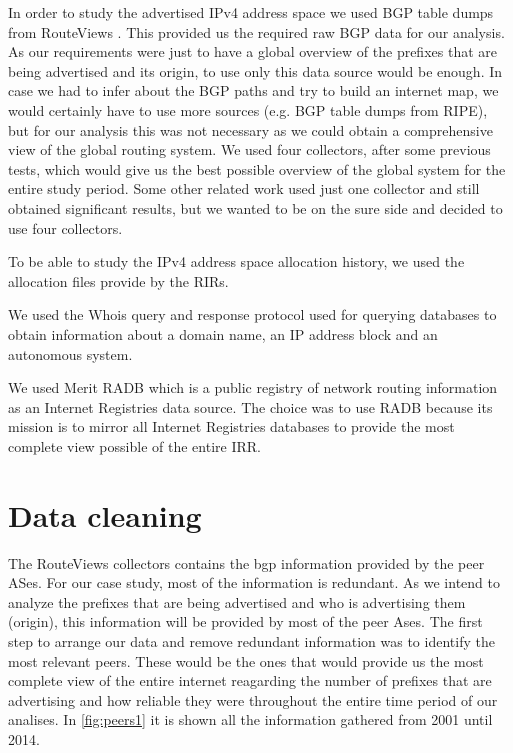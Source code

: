 \documentclass[11pt,a4paper]{scrreprt}
\begin{document}
In order to study the advertised IPv4 address space we used BGP table dumps from RouteViews \cite{RouteViews}. This provided us the required raw BGP data for our analysis. As our requirements were just to have a global overview of the prefixes that are being advertised and its origin, to use only this data source would be enough. In case we had to infer about the BGP paths and try to build an internet map, we would certainly have to use more sources (e.g. BGP table dumps from RIPE), but for our analysis this was not necessary as we could obtain a comprehensive view of the global routing system.
We used four collectors, after some previous tests, which would give us the best possible overview of the global system for the entire study period. Some other related work \cite{Address_Space_Deaggregation} used just one collector and still obtained significant results, but we wanted to be on the sure side and decided to use four collectors. 

To be able to study the IPv4 address space allocation history, we used the allocation files \cite{Potaroo} provide by the RIRs.

We used the Whois \cite{Whois} query and response protocol used for querying databases to obtain information about a domain name, an IP address block and an autonomous system. 

We used Merit RADB \cite{RADB} which is a public registry of network routing information as an Internet Registries data source. The choice was to use RADB because its mission is to mirror all Internet Registries  databases to provide the most complete view possible of the entire IRR. 

\section{Data cleaning}
The RouteViews collectors contains the bgp information provided by the peer ASes. For our case study, most of the information is redundant. As we intend to analyze the prefixes that are being advertised and who is advertising them (origin), this information will be provided by most of the peer Ases. The first step to arrange our data and remove redundant information was to identify the most relevant peers. These would be the ones that would provide us the most complete view of the entire internet reagarding the number of prefixes that are advertising and how reliable they were throughout the entire time period of our analises. In \ref{fig:peers1} it is shown all the information gathered from 2001 until 2014. 
\end{document}
